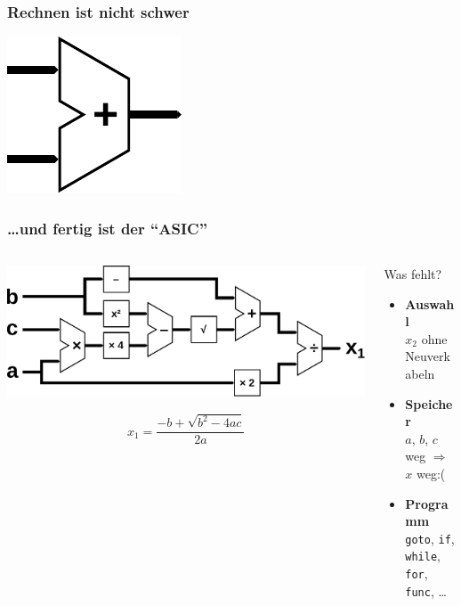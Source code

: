 \documentclass[t,aspectratio=169,usenames,dvipsnames]{beamer}
\begin{document}
\begin{frame}
  \frametitle{Rechnen ist nicht schwer}

  \begin{center}
    \includegraphics[height=.7\textheight]{adder.pdf}
  \end{center}
\end{frame}

\begin{frame}
  \frametitle{\ldots und fertig ist der \enquote{ASIC}}

  \begin{columns}
    \begin{column}{.45\textwidth}
      \begin{center}
        \includegraphics[width=\linewidth]{abc-formel.pdf}

        \[ x_1 = \frac{-b + \sqrt{b^2 - 4ac}}{2a} \]
      \end{center}
    \end{column}
    \begin{column}{.45\textwidth}
      Was fehlt?
      \begin{itemize}
      \item \textbf{Auswahl}\\
        $x_2$ ohne Neuverkabeln
      \item \textbf{Speicher}\\
        $a$, $b$, $c$ weg $\Rightarrow$ $x$ weg\quad :(
      \item \textbf{Programm}\\
        \texttt{goto}, \texttt{if}, \texttt{while}, \texttt{for}, \texttt{func}, \ldots
      \end{itemize}
    \end{column}
  \end{columns}
\end{frame}
\end{document}
